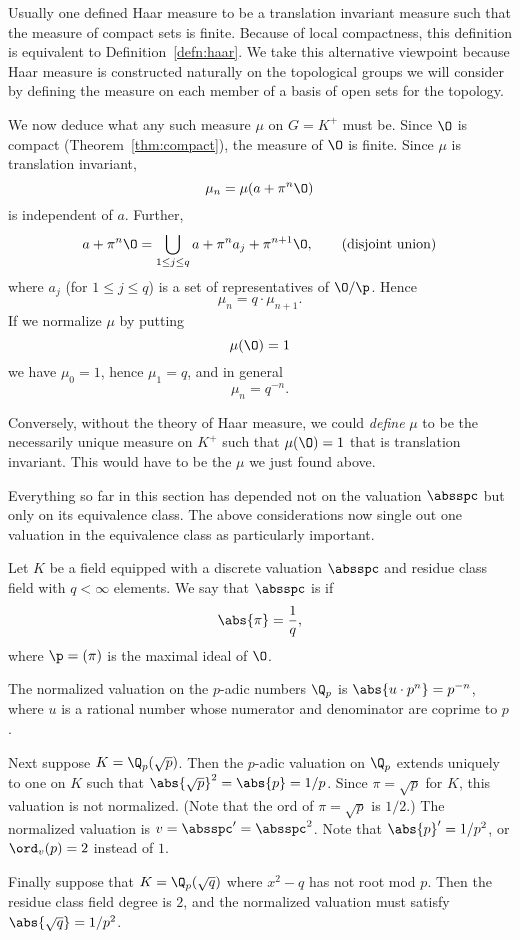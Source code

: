 \begin{remark}
  Usually one defined Haar measure to be a translation invariant
  measure such that the measure of compact sets is finite.  Because of
  local compactness, this definition is equivalent to
  Definition~\ref{defn:haar}.  We take this alternative viewpoint
  because Haar measure is constructed naturally on the topological
  groups we will consider by defining the measure on each member of a
  basis of open sets for the topology.
\end{remark}

We now deduce what any such measure $\mu$ on $G=K^+$ must be.  Since
$\O$ is compact (Theorem~\ref{thm:compact}), the measure of $\O$ is
finite.  Since $\mu$ is translation invariant,
$$
  \mu_n = \mu(a + \pi^n \O)
$$
is independent of $a$.  Further, 
$$
a + \pi^n\O = \bigcup_{1\leq j\leq q} a + \pi^n a_j + \pi^{n+1}\O,
\qquad\text{(disjoint union)}
$$
where $a_j$ (for $1\leq j \leq q$) is a set of representatives of
$\O/\p$. Hence
$$
 \mu_n = q\cdot \mu_{n+1}.
$$
If we normalize $\mu$ by putting 
$$
 \mu(\O) = 1
 $$
 we have $\mu_0 = 1$, hence $\mu_1 = q$, and in general $$\mu_n =
 q^{-n}.$$
 
 Conversely, without the theory of Haar measure, we could {\em define}
 $\mu$ to be the necessarily unique measure on $K^+$ such that
 $\mu(\O)=1$ that is translation invariant.  This would have to be the
 $\mu$ we just found above.
 
 Everything so far in this section has depended not on the valuation
 $\absspc$ but only on its equivalence class.  The above
 considerations now single out one valuation in the equivalence class
 as particularly important.
\begin{definition}\label{defn:normalized}
Let $K$ be a field equipped with a discrete valuation $\absspc$
and residue class field with $q<\infty$ elements.  We say that
$\absspc$ is  if 
$$
\abs{\pi} = \frac{1}{q},
$$
where $\p=(\pi)$ is the maximal ideal of $\O$.
\end{definition}
\begin{example}
The normalized valuation on the $p$-adic numbers $\Q_p$ is 
$\abs{u\cdot p^n} = p^{-n}$, where $u$ is a rational number
whose numerator and denominator are coprime to $p$.

Next suppose $K=\Q_p(\sqrt{p})$.  Then the $p$-adic valuation on 
$\Q_p$ extends uniquely to one on $K$ such that 
$\abs{\sqrt{p}}^2 = \abs{p} = 1/p$.  Since $\pi=\sqrt{p}$
for $K$, this valuation is not normalized.  (Note that
the ord of $\pi=\sqrt{p}$ is $1/2$.)
The normalized valuation is $v=\absspc' = \absspc^2$.  Note that 
$\abs{p}' = 1/p^2$, or $\ord_v(p)=2$ instead of $1$.

Finally suppose that $K=\Q_p(\sqrt{q})$ where $x^2-q$
has not root mod $p$.  Then the residue class field 
degree is $2$, and the normalized valuation must
satisfy $\abs{\sqrt{q}} = 1/p^2$.
\end{example}

